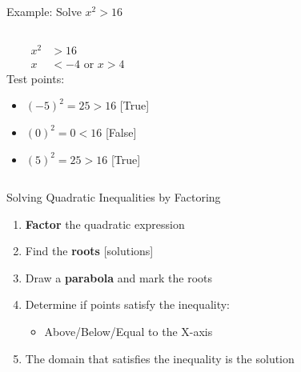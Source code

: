 \documentclass[aspectratio=169]{beamer}
\begin{document}
\begin{frame}{Example: Solve $x^2 > 16$}
    \begin{columns}
        \begin{tcolorbox}[colback=secondary!10,colframe=primary,title=Solution]
            \footnotesize
            \begin{align*}
                x^2 &> 16 \\
                x &< -4 \text{ or } x > 4
            \end{align*}
            Test points:
            \begin{itemize}
                \item $(-5)^2 = 25 > 16$ [True]
                \item $(0)^2 = 0 < 16$ [False]
                \item $(5)^2 = 25 > 16$ [True]
            \end{itemize}
        \end{tcolorbox}
        
        \begin{center}
        \end{center}
    \end{columns}
\end{frame}

\begin{frame}{Solving Quadratic Inequalities by Factoring}
    \begin{tcolorbox}[colback=lightgray,colframe=primary,title=Method]
        \footnotesize
        \begin{enumerate}
            \item \textcolor{accent}{\textbf{Factor}} the quadratic expression
            \item Find the \textcolor{accent}{\textbf{roots}} [solutions]
            \item Draw a \textcolor{accent}{\textbf{parabola}} and mark the roots
            \item Determine if points satisfy the inequality:
            \begin{itemize}
                \item Above/Below/Equal to the X-axis
            \end{itemize}
            \item The domain that satisfies the inequality is the solution
        \end{enumerate}
    \end{tcolorbox}
\end{frame}
\end{document}

